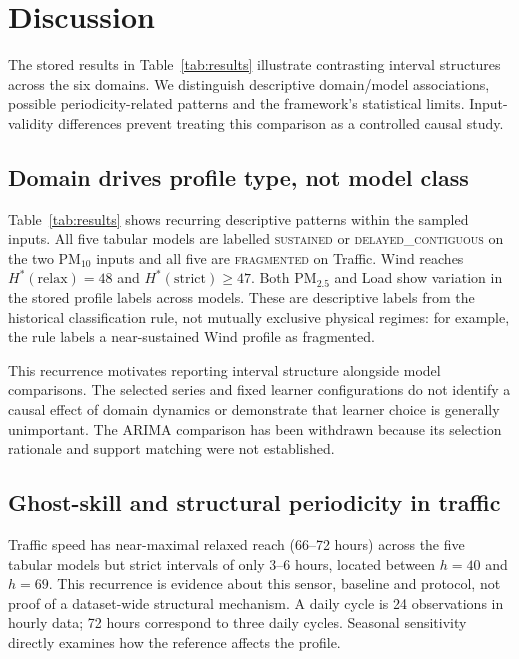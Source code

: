\documentclass[pdflatex,sn-mathphys]{sn-jnl}
\begin{document}
\section{Discussion}\label{sec:discussion}

The stored results in Table~\ref{tab:results} illustrate contrasting interval structures across the six domains. We distinguish descriptive domain/model associations, possible periodicity-related patterns and the framework's statistical limits. Input-validity differences prevent treating this comparison as a controlled causal study.

\subsection{Domain drives profile type, not model class}

Table~\ref{tab:results} shows recurring descriptive patterns within the sampled
inputs. All five tabular models are labelled \textsc{sustained} or
\textsc{delayed\_contiguous} on the two PM$_{10}$ inputs and all five are
\textsc{fragmented} on Traffic. Wind reaches $H^*(\mathrm{relax})=48$ and
$H^*(\mathrm{strict})\geq47$. Both PM$_{2.5}$ and Load show variation in the
stored profile labels across models. These are descriptive labels from the
historical classification rule, not mutually exclusive physical regimes:
for example, the rule labels a near-sustained Wind profile as fragmented.

This recurrence motivates reporting interval structure alongside model
comparisons. The selected series and fixed learner configurations do not
identify a causal effect of domain dynamics or demonstrate that learner
choice is generally unimportant. The ARIMA comparison has been withdrawn
because its selection rationale and support matching were not established.

\subsection{Ghost-skill and structural periodicity in traffic}

Traffic speed has near-maximal relaxed reach (66--72 hours) across the five
tabular models but strict intervals of only 3--6 hours, located between
$h=40$ and $h=69$. This recurrence is evidence about this sensor, baseline and
protocol, not proof of a dataset-wide structural mechanism. A daily cycle is
24 observations in hourly data; 72 hours correspond to three daily cycles.
Seasonal sensitivity directly examines how the reference affects the profile.
\end{document}
